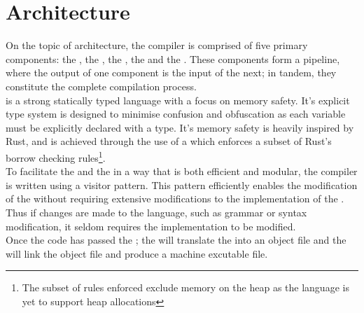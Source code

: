 \section{Architecture}
\label{sec:architecture}

On the topic of architecture, the \lang{} compiler is comprised of five primary
components: the \lexer, the \parser, the \static, the \codeGen{} and the \gcc. These
components form a pipeline, where the output of one component is the input of the
next; in tandem, they constitute the complete compilation process. \\

\lang{} is a strong statically typed language with a focus on memory safety. It's
explicit type system is designed to minimise confusion and obfuscation as each
variable must be explicitly declared with a type. It's memory safety is heavily
inspired by Rust, and is achieved through the use of a \borrowChecker{} which enforces
a subset of Rust's borrow checking rules\footnote{The subset of rules enforced
exclude memory on the heap as the language is yet to support heap allocations}. \\



To facilitate the \static{} and the \codeGen{} in a way that is both efficient and
modular, the \lang{} compiler is written using a visitor pattern. This pattern
efficiently enables the modification of the \ast{} without requiring extensive
modifications to the implementation of the \ast. Thus if changes are made to the
\lang{} language, such as grammar or syntax modification, it seldom requires the
\ast{} implementation to be modified. \\

Once the code has passed the \static{}; the \codeGen{} will translate the \ast{} into
an object file and the \gcc{} will link the object file and produce a machine excutable file.

\newpage





